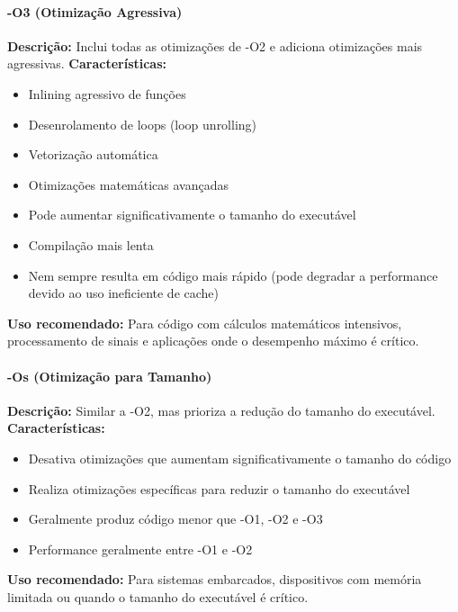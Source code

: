 \documentclass[12pt,a4paper]{article}
\begin{document}
\paragraph{-O3 (Otimização Agressiva)}
\textbf{Descrição:} Inclui todas as otimizações de -O2 e adiciona otimizações mais agressivas.
\textbf{Características:}
\begin{itemize}
    \item Inlining agressivo de funções
    \item Desenrolamento de loops (loop unrolling)
    \item Vetorização automática
    \item Otimizações matemáticas avançadas
    \item Pode aumentar significativamente o tamanho do executável
    \item Compilação mais lenta
    \item Nem sempre resulta em código mais rápido (pode degradar a performance devido ao uso ineficiente de cache)
\end{itemize}
\textbf{Uso recomendado:} Para código com cálculos matemáticos intensivos, processamento de sinais e aplicações onde o desempenho máximo é crítico.

\paragraph{-Os (Otimização para Tamanho)}
\textbf{Descrição:} Similar a -O2, mas prioriza a redução do tamanho do executável.
\textbf{Características:}
\begin{itemize}
    \item Desativa otimizações que aumentam significativamente o tamanho do código
    \item Realiza otimizações específicas para reduzir o tamanho do executável
    \item Geralmente produz código menor que -O1, -O2 e -O3
    \item Performance geralmente entre -O1 e -O2
\end{itemize}
\textbf{Uso recomendado:} Para sistemas embarcados, dispositivos com memória limitada ou quando o tamanho do executável é crítico.
\end{document}
